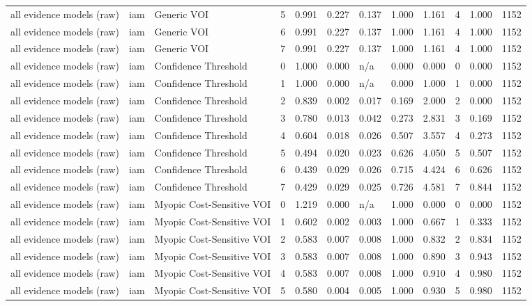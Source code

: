 \begin{table}[!ht]
{\begin{tabular}{llllllllllll}
all evidence models (raw) & iam & Generic VOI & 5 & 0.991 & 0.227 & 0.137 & 1.000 & 1.161 & 4 & 1.000 & 1152 \\
all evidence models (raw) & iam & Generic VOI & 6 & 0.991 & 0.227 & 0.137 & 1.000 & 1.161 & 4 & 1.000 & 1152 \\
all evidence models (raw) & iam & Generic VOI & 7 & 0.991 & 0.227 & 0.137 & 1.000 & 1.161 & 4 & 1.000 & 1152 \\
all evidence models (raw) & iam & Confidence Threshold & 0 & 1.000 & 0.000 & n/a & 0.000 & 0.000 & 0 & 0.000 & 1152 \\
all evidence models (raw) & iam & Confidence Threshold & 1 & 1.000 & 0.000 & n/a & 0.000 & 1.000 & 1 & 0.000 & 1152 \\
all evidence models (raw) & iam & Confidence Threshold & 2 & 0.839 & 0.002 & 0.017 & 0.169 & 2.000 & 2 & 0.000 & 1152 \\
all evidence models (raw) & iam & Confidence Threshold & 3 & 0.780 & 0.013 & 0.042 & 0.273 & 2.831 & 3 & 0.169 & 1152 \\
all evidence models (raw) & iam & Confidence Threshold & 4 & 0.604 & 0.018 & 0.026 & 0.507 & 3.557 & 4 & 0.273 & 1152 \\
all evidence models (raw) & iam & Confidence Threshold & 5 & 0.494 & 0.020 & 0.023 & 0.626 & 4.050 & 5 & 0.507 & 1152 \\
all evidence models (raw) & iam & Confidence Threshold & 6 & 0.439 & 0.029 & 0.026 & 0.715 & 4.424 & 6 & 0.626 & 1152 \\
all evidence models (raw) & iam & Confidence Threshold & 7 & 0.429 & 0.029 & 0.025 & 0.726 & 4.581 & 7 & 0.844 & 1152 \\
all evidence models (raw) & iam & Myopic Cost-Sensitive VOI & 0 & 1.219 & 0.000 & n/a & 1.000 & 0.000 & 0 & 0.000 & 1152 \\
all evidence models (raw) & iam & Myopic Cost-Sensitive VOI & 1 & 0.602 & 0.002 & 0.003 & 1.000 & 0.667 & 1 & 0.333 & 1152 \\
all evidence models (raw) & iam & Myopic Cost-Sensitive VOI & 2 & 0.583 & 0.007 & 0.008 & 1.000 & 0.832 & 2 & 0.834 & 1152 \\
all evidence models (raw) & iam & Myopic Cost-Sensitive VOI & 3 & 0.583 & 0.007 & 0.008 & 1.000 & 0.890 & 3 & 0.943 & 1152 \\
all evidence models (raw) & iam & Myopic Cost-Sensitive VOI & 4 & 0.583 & 0.007 & 0.008 & 1.000 & 0.910 & 4 & 0.980 & 1152 \\
all evidence models (raw) & iam & Myopic Cost-Sensitive VOI & 5 & 0.580 & 0.004 & 0.005 & 1.000 & 0.930 & 5 & 0.980 & 1152 \\

\end{tabular}}
\end{table}
